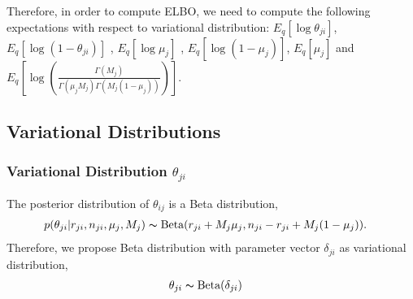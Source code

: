 \documentclass[11pt,reqno]{amsart}
\begin{document}
Therefore, in order to compute ELBO, we need to compute the following expectations with respect to variational distribution: $ E_q \left[ \log \theta_{ji} \right] $, $ E_q\left[ \log \left( 1 - \theta_{ji}\right) \right] $ , $ E_q  \left[ \log \mu_j \right] $ , $ E_q  \left[ \log (1 - \mu_j)\right] $, $ E_q \left[ \mu_j \right] $ and $ E_q\left[ \log \left( \frac{ \Gamma(M_j) } { \Gamma(\mu_j M_j) \Gamma(M_j (1-\mu_j)) }\right)\right] $.%

\subsection{Variational Distributions}
\subsubsection{Variational Distribution $\theta_{ji}$}
The posterior distribution of $\theta_{ij}$ is a Beta distribution,
\begin{align}
p(\theta_{ji}|r_{ji},n_{ji},\mu_j,M_j)&\thicksim \text{Beta}(r_{ji}+M_j \mu_j, n_{ji}-r_{ji}+M_j(1-\mu_j)).
\end{align}
Therefore, we propose Beta distribution with parameter vector $\delta_{ji}$ as variational distribution,
\begin{align}
\theta_{ji} &\thicksim \text{Beta}(\delta_{ji}) \nonumber
\end{align}
%
\end{document}
